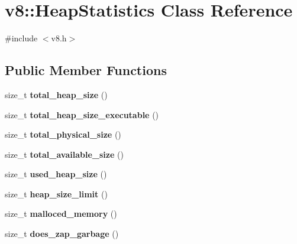 \hypertarget{classv8_1_1HeapStatistics}{}\section{v8\+:\+:Heap\+Statistics Class Reference}
\label{classv8_1_1HeapStatistics}


{\ttfamily \#include $<$v8.\+h$>$}

\subsection*{Public Member Functions}
\begin{DoxyCompactItemize}
\item 
size\+\_\+t {\bfseries total\+\_\+heap\+\_\+size} ()\hypertarget{classv8_1_1HeapStatistics_ac005b9c55d5818b6969c8fd61359139b}{}\label{classv8_1_1HeapStatistics_ac005b9c55d5818b6969c8fd61359139b}

\item 
size\+\_\+t {\bfseries total\+\_\+heap\+\_\+size\+\_\+executable} ()\hypertarget{classv8_1_1HeapStatistics_aa935ea51c12ec64049c06b532dbb4f8d}{}\label{classv8_1_1HeapStatistics_aa935ea51c12ec64049c06b532dbb4f8d}

\item 
size\+\_\+t {\bfseries total\+\_\+physical\+\_\+size} ()\hypertarget{classv8_1_1HeapStatistics_a084994a3a5edf15b73c9b171a911a487}{}\label{classv8_1_1HeapStatistics_a084994a3a5edf15b73c9b171a911a487}

\item 
size\+\_\+t {\bfseries total\+\_\+available\+\_\+size} ()\hypertarget{classv8_1_1HeapStatistics_aa6df7f6e60766279cf4d8447a6d4d14d}{}\label{classv8_1_1HeapStatistics_aa6df7f6e60766279cf4d8447a6d4d14d}

\item 
size\+\_\+t {\bfseries used\+\_\+heap\+\_\+size} ()\hypertarget{classv8_1_1HeapStatistics_a05ecb48bceea49d2fe430c81df02babc}{}\label{classv8_1_1HeapStatistics_a05ecb48bceea49d2fe430c81df02babc}

\item 
size\+\_\+t {\bfseries heap\+\_\+size\+\_\+limit} ()\hypertarget{classv8_1_1HeapStatistics_a27e5a1ba9bc8530c6bf1cf277ce3d179}{}\label{classv8_1_1HeapStatistics_a27e5a1ba9bc8530c6bf1cf277ce3d179}

\item 
size\+\_\+t {\bfseries malloced\+\_\+memory} ()\hypertarget{classv8_1_1HeapStatistics_a288dcfe7dba458223d02788471990060}{}\label{classv8_1_1HeapStatistics_a288dcfe7dba458223d02788471990060}

\item 
size\+\_\+t {\bfseries does\+\_\+zap\+\_\+garbage} ()\hypertarget{classv8_1_1HeapStatistics_a459f7892a7d56747302e8e9a688debad}{}\label{classv8_1_1HeapStatistics_a459f7892a7d56747302e8e9a688debad}

\end{DoxyCompactItemize}
